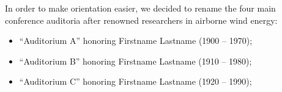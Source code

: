 \begin{multicols}{2}
In order to make orientation easier, we decided to rename the four main conference auditoria after renowned researchers in airborne wind energy:
\begin{itemize}
\item ``Auditorium A'' honoring Firstname Lastname (1900 -- 1970);

\item ``Auditorium B'' honoring Firstname Lastname (1910 -- 1980);

\item ``Auditorium C'' honoring Firstname Lastname (1920 -- 1990);

\end{itemize}


\end{multicols}

\clearpage

\label{photo:00-image}

\renewcommand*{\raggedleftmarginnote}{}
\renewcommand*{\raggedrightmarginnote}{}
\vspace*{47mm}
\vspace{-7.4mm}

